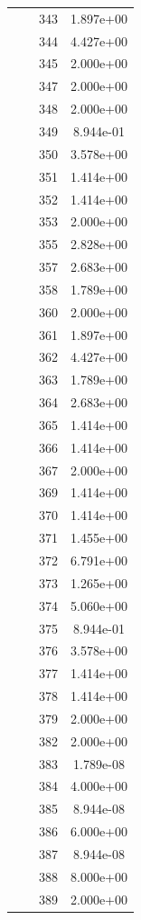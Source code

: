 \documentclass[12pt]{article}
\begin{document}
\begin{longtable}{@{}cccc@{}}
 &  & 343 & 1.897e+00 \\
 &  & 344 & 4.427e+00 \\
 &  & 345 & 2.000e+00 \\
 &  & 347 & 2.000e+00 \\
 &  & 348 & 2.000e+00 \\
 &  & 349 & 8.944e-01 \\
 &  & 350 & 3.578e+00 \\
 &  & 351 & 1.414e+00 \\
 &  & 352 & 1.414e+00 \\
 &  & 353 & 2.000e+00 \\
 &  & 355 & 2.828e+00 \\
 &  & 357 & 2.683e+00 \\
 &  & 358 & 1.789e+00 \\
 &  & 360 & 2.000e+00 \\
 &  & 361 & 1.897e+00 \\
 &  & 362 & 4.427e+00 \\
 &  & 363 & 1.789e+00 \\
 &  & 364 & 2.683e+00 \\
 &  & 365 & 1.414e+00 \\
 &  & 366 & 1.414e+00 \\
 &  & 367 & 2.000e+00 \\
 &  & 369 & 1.414e+00 \\
 &  & 370 & 1.414e+00 \\
 &  & 371 & 1.455e+00 \\
 &  & 372 & 6.791e+00 \\
 &  & 373 & 1.265e+00 \\
 &  & 374 & 5.060e+00 \\
 &  & 375 & 8.944e-01 \\
 &  & 376 & 3.578e+00 \\
 &  & 377 & 1.414e+00 \\
 &  & 378 & 1.414e+00 \\
 &  & 379 & 2.000e+00 \\
 &  & 382 & 2.000e+00 \\
 &  & 383 & 1.789e-08 \\
 &  & 384 & 4.000e+00 \\
 &  & 385 & 8.944e-08 \\
 &  & 386 & 6.000e+00 \\
 &  & 387 & 8.944e-08 \\
 &  & 388 & 8.000e+00 \\
 &  & 389 & 2.000e+00 \\

\end{longtable}
\end{document}
